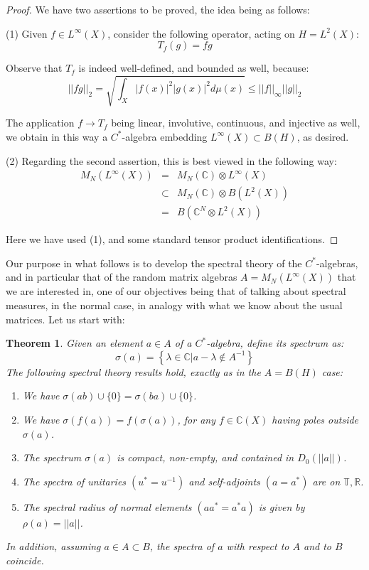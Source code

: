 \documentclass[12pt]{amsbook}
\newtheorem{theorem}{Theorem}[chapter]
\begin{document}
\begin{proof}
We have two assertions to be proved, the idea being as follows:

\medskip

(1) Given $f\in L^\infty(X)$, consider the following operator, acting on $H=L^2(X)$:
$$T_f(g)=fg$$

Observe that $T_f$ is indeed well-defined, and bounded as well, because:
$$||fg||_2
=\sqrt{\int_X|f(x)|^2|g(x)|^2d\mu(x)}
\leq||f||_\infty||g||_2$$

The application $f\to T_f$ being linear, involutive, continuous, and injective as well, we obtain in this way a $C^*$-algebra embedding $L^\infty(X)\subset B(H)$, as desired.

\medskip

(2) Regarding the second assertion, this is best viewed in the following way:
\begin{eqnarray*}
M_N(L^\infty(X))
&=&M_N(\mathbb C)\otimes L^\infty(X)\\
&\subset&M_N(\mathbb C)\otimes B(L^2(X))\\
&=&B\left(\mathbb C^N\otimes L^2(X)\right)
\end{eqnarray*}

Here we have used (1), and some standard tensor product identifications.
\end{proof}

Our purpose in what follows is to develop the spectral theory of the $C^*$-algebras, and in particular that of the random matrix algebras $A=M_N(L^\infty(X))$ that we are interested in, one of our objectives being that of talking about spectral measures, in the normal case, in analogy with what we know about the usual matrices. Let us start with:

\begin{theorem}
Given an element $a\in A$ of a $C^*$-algebra, define its spectrum as:
$$\sigma(a)=\left\{\lambda\in\mathbb C\Big|a-\lambda\notin A^{-1}\right\}$$
The following spectral theory results hold, exactly as in the $A=B(H)$ case:
\begin{enumerate}
\item We have $\sigma(ab)\cup\{0\}=\sigma(ba)\cup\{0\}$.

\item We have $\sigma(f(a))=f(\sigma(a))$, for any $f\in\mathbb C(X)$ having poles outside $\sigma(a)$.

\item The spectrum $\sigma(a)$ is compact, non-empty, and contained in $D_0(||a||)$.

\item The spectra of unitaries $(u^*=u^{-1})$ and self-adjoints $(a=a^*)$ are on $\mathbb T,\mathbb R$.

\item The spectral radius of normal elements $(aa^*=a^*a)$ is given by $\rho(a)=||a||$.
\end{enumerate}
In addition, assuming $a\in A\subset B$, the spectra of $a$ with respect to $A$ and to $B$ coincide.
\end{theorem}
\end{document}
